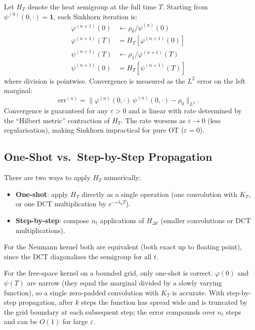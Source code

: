 \documentclass[11pt]{article}
\newcommand{\eps}{\varepsilon}
\newcommand{\dt}{\Delta t}
\theoremstyle{remark}
\begin{document}
Let $H_T$ denote the heat semigroup at the full time $T$.
Starting from $\psi^{(0)}(0,\cdot) = \mathbf{1}$, each Sinkhorn iteration is:
\begin{align}
  \varphi^{(n+1)}(0) &\leftarrow \rho_0 / \psi^{(n)}(0)       \label{eq:sink1} \\
  \varphi^{(n+1)}(T) &= H_T[\varphi^{(n+1)}(0)]               \label{eq:sink2} \\
  \psi^{(n+1)}(T)    &\leftarrow \rho_1 / \varphi^{(n+1)}(T)  \label{eq:sink3} \\
  \psi^{(n+1)}(0)    &= H_T[\psi^{(n+1)}(T)]                  \label{eq:sink4}
\end{align}
where division is pointwise.
Convergence is measured as the $L^2$ error on the left marginal:
\begin{equation}
  \text{err}^{(n)} = \|\varphi^{(n)}(0,\cdot)\, \psi^{(n)}(0,\cdot) - \rho_0\|_{L^2}.
\end{equation}
Convergence is guaranteed for any $\eps > 0$ and is linear with rate determined by the
``Hilbert metric'' contraction of $H_T$.
The rate worsens as $\eps \to 0$ (less regularisation), making Sinkhorn impractical for
pure OT ($\eps = 0$).

\subsection{One-Shot vs.\ Step-by-Step Propagation}

There are two ways to apply $H_T$ numerically:
\begin{itemize}
  \item \textbf{One-shot}: apply $H_T$ directly as a single operation (one convolution
        with $K_T$, or one DCT multiplication by $e^{-\eps\lambda_k T}$).
  \item \textbf{Step-by-step}: compose $n_t$ applications of $H_{\dt}$ (smaller
        convolutions or DCT multiplications).
\end{itemize}

For the Neumann kernel both are equivalent (both exact up to floating point), since the
DCT diagonalises the semigroup for all $t$.

For the free-space kernel on a bounded grid, only one-shot is correct.
$\varphi(0)$ and $\psi(T)$ are narrow (they equal the marginal divided by a slowly
varying function), so a single zero-padded convolution with $K_T$ is accurate.
With step-by-step propagation, after $k$ steps the function has spread wide and is
truncated by the grid boundary at each subsequent step; the error compounds over
$n_t$ steps and can be $O(1)$ for large $\eps$.
\end{document}
